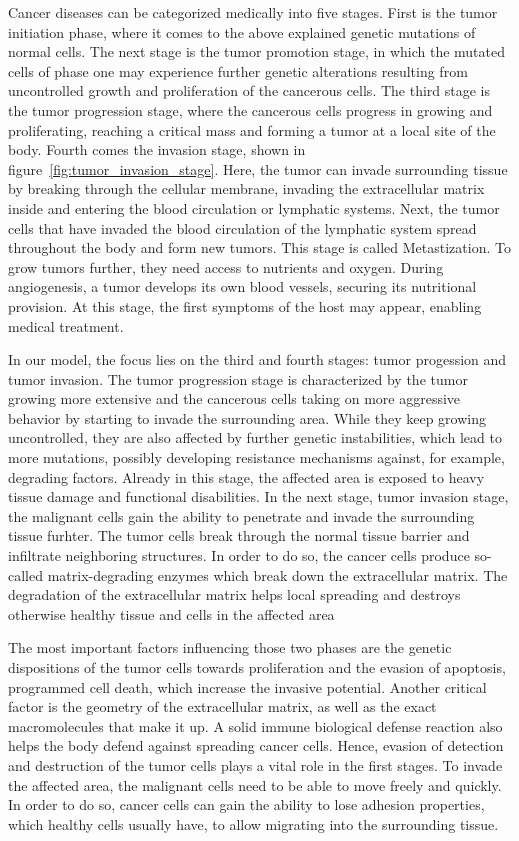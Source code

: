 Cancer diseases can be categorized medically into five stages. First is the tumor initiation phase, where it comes to the above explained genetic mutations of normal cells. The next stage is the tumor promotion stage, in which the mutated cells of phase one may experience further genetic alterations resulting from uncontrolled growth and proliferation of the cancerous cells. The third stage is the tumor progression stage, where the cancerous cells progress in growing and proliferating, reaching a critical mass and forming a tumor at a local site of the body. Fourth comes the invasion stage, shown in figure~\ref{fig:tumor_invasion_stage}. Here, the tumor can invade surrounding tissue by breaking through the cellular membrane, invading the extracellular matrix inside and entering the blood circulation or lymphatic systems. Next, the tumor cells that have invaded the blood circulation of the lymphatic system spread throughout the body and form new tumors. This stage is called Metastization. To grow tumors further, they need access to nutrients and oxygen. During angiogenesis, a tumor develops its own blood vessels, securing its nutritional provision. At this stage, the first symptoms of the host may appear, enabling medical treatment.

In our model, the focus lies on the third and fourth stages: tumor progession and tumor invasion. The tumor progression stage is characterized by the tumor growing more extensive and the cancerous cells taking on more aggressive behavior by starting to invade the surrounding area. While they keep growing uncontrolled, they are also affected by further genetic instabilities, which lead to more mutations, possibly developing resistance mechanisms against, for example, degrading factors. Already in this stage, the affected area is exposed to heavy tissue damage and functional disabilities. In the next stage, tumor invasion stage, the malignant cells gain the ability to penetrate and invade the surrounding tissue furhter. The tumor cells break through the normal tissue barrier and infiltrate neighboring structures. In order to do so, the cancer cells produce so-called matrix-degrading enzymes which break down the extracellular matrix. The degradation of the extracellular matrix helps local spreading and destroys otherwise healthy tissue and cells in the affected area

The most important factors influencing those two phases are the genetic dispositions of the tumor cells towards proliferation and the evasion of apoptosis, programmed cell death, which increase the invasive potential. Another critical factor is the geometry of the extracellular matrix, as well as the exact macromolecules that make it up. A solid immune biological defense reaction also helps the body defend against spreading cancer cells. Hence, evasion of detection and destruction of the tumor cells plays a vital role in the first stages. To invade the affected area, the malignant cells need to be able to move freely and quickly. In order to do so, cancer cells can gain the ability to lose adhesion properties, which healthy cells usually have, to allow migrating into the surrounding tissue.

